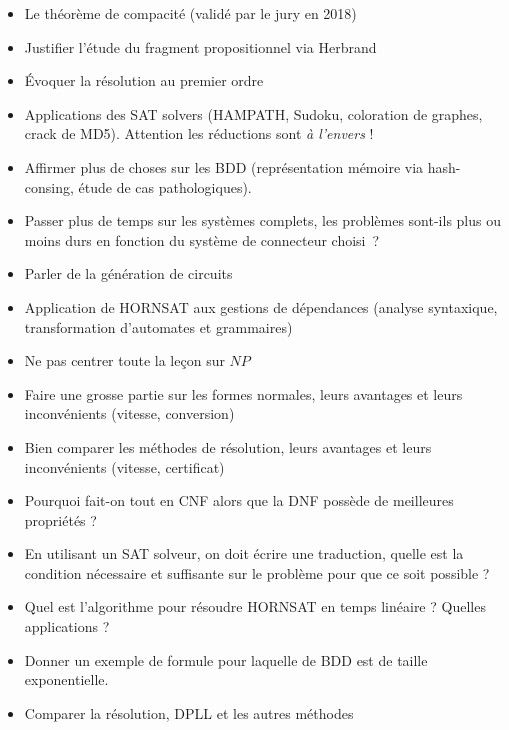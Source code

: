 \documentclass{agregfiche}
\begin{document}
\begin{itemize}
    \item Le théorème de compacité (validé par le jury en 2018)
    \item Justifier l'étude du fragment propositionnel
        via Herbrand
    \item Évoquer la résolution au premier ordre
    \item Applications des SAT solvers 
        (HAMPATH, Sudoku, coloration de graphes, crack de MD5). 
        Attention les réductions sont \emph{à l'envers} !
    \item Affirmer plus de choses sur les BDD (représentation mémoire
        via hash-consing,
        étude de cas pathologiques).
    \item Passer plus de temps sur les systèmes complets, les problèmes sont-ils 
        plus ou moins durs en fonction du système de connecteur choisi~?
    \item Parler de la génération de circuits
    \item Application de HORNSAT aux gestions de dépendances (analyse
        syntaxique, transformation d'automates et grammaires)
\end{itemize}

\secpieges

\begin{itemize}
    \item Ne pas centrer toute la leçon sur $NP$
    \item Faire une grosse partie sur les formes normales, leurs avantages
        et leurs inconvénients (vitesse, conversion)
    \item Bien comparer les méthodes de résolution, leurs avantages et leurs
        inconvénients (vitesse, certificat)
\end{itemize}


\secquestionsclassiques

\begin{itemize}
    \item Pourquoi fait-on tout en CNF alors que la DNF possède de meilleures 
        propriétés ?
    \item En utilisant un SAT solveur, on doit écrire une traduction, quelle
        est la condition nécessaire et suffisante sur le problème pour que ce soit
        possible ?
    \item Quel est l'algorithme pour résoudre HORNSAT en temps linéaire ?
        Quelles applications ?
    \item Donner un exemple de formule pour laquelle de BDD est de taille
        exponentielle.
    \item Comparer la résolution, DPLL et les autres méthodes
\end{itemize}
\end{document}
